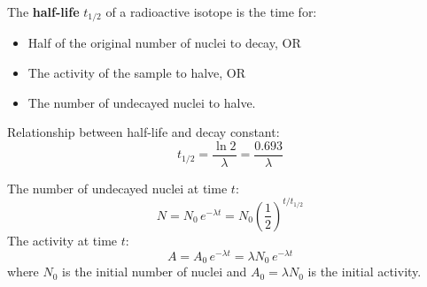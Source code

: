 \begin{definitionbox}
The \textbf{half-life} $t_{1/2}$ of a radioactive
isotope is the time for:
\begin{itemize}[noitemsep]
  \item Half of the original number of nuclei to
  decay, OR
  \item The activity of the sample to halve, OR
  \item The number of undecayed nuclei to halve.
\end{itemize}

Relationship between half-life and decay constant:
\[
  t_{1/2} = \frac{\ln 2}{\lambda} = \frac{0.693}{\lambda}
\]
\end{definitionbox}

\begin{lawbox}
The number of undecayed nuclei at time $t$:
\[
  N = N_0\,e^{-\lambda t}
  = N_0\left(\frac{1}{2}\right)^{t/t_{1/2}}
\]
The activity at time $t$:
\[
  A = A_0\,e^{-\lambda t}
  = \lambda N_0\,e^{-\lambda t}
\]
where $N_0$ is the initial number of nuclei and
$A_0 = \lambda N_0$ is the initial activity.
\end{lawbox}

